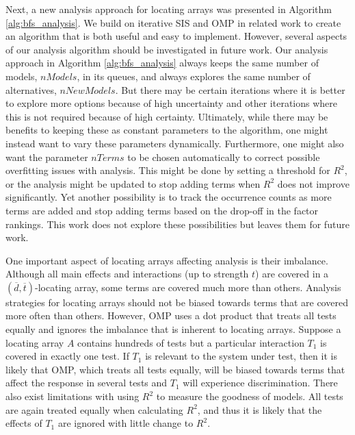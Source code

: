 Next, a new analysis approach for locating arrays was presented in Algorithm \ref{alg:bfs_analysis}.
We build on iterative SIS and OMP in related work to create an algorithm that is both useful and easy to implement.
However, several aspects of our analysis algorithm should be investigated in future work.
Our analysis approach in Algorithm \ref{alg:bfs_analysis} always keeps the same number of models, $\mathit{nModels}$, in its queues, and always explores the same number of alternatives, $\mathit{nNewModels}$.
But there may be certain iterations where it is better to explore more options because of high uncertainty and other iterations where this is not required because of high certainty.
Ultimately, while there may be benefits to keeping these as constant parameters to the algorithm, one might instead want to vary these parameters dynamically.
Furthermore, one might also want the parameter $nTerms$ to be chosen automatically to correct possible overfitting issues with analysis.
This might be done by setting a threshold for $R^2$, or the analysis might be updated to stop adding terms when $R^2$ does not improve significantly.
Yet another possibility is to track the occurrence counts as more terms are added and stop adding terms based on the drop-off in the factor rankings.
This work does not explore these possibilities but leaves them for future work.

One important aspect of locating arrays affecting analysis is their imbalance.
Although all main effects and interactions (up to strength $t$) are covered in a $(\overline{d},\overline{t})$-locating array, some terms are covered much more than others.
Analysis strategies for locating arrays should not be biased towards terms that are covered more often than others.
However, OMP uses a dot product that treats all tests equally and ignores the imbalance that is inherent to locating arrays.
Suppose a locating array $A$ contains hundreds of tests but a particular interaction $T_1$ is covered in exactly one test.
If $T_1$ is relevant to the system under test, then it is likely that OMP, which treats all tests equally, will be biased towards terms that affect the response in several tests and $T_1$ will experience discrimination.
There also exist limitations with using $R^2$ to measure the goodness of models.
All tests are again treated equally when calculating $R^2$, and thus it is likely that the effects of $T_1$ are ignored with little change to $R^2$.

